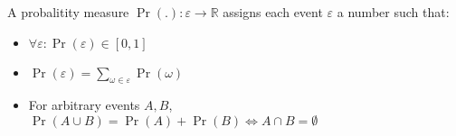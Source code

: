 A probalitity measure $\operatorname{Pr}(.): \varepsilon \to \mathbb{R}$ assigns each event $\varepsilon$ a number such that:
\begin{itemize}
	\item $\forall \varepsilon : \operatorname{Pr}(\varepsilon) \in [0, 1]$
	\item $\operatorname{Pr}(\varepsilon) = \sum\limits_{\omega \in \varepsilon} \operatorname{Pr}(\omega)$
	\item For arbitrary events $A,B$, $\operatorname{Pr}(A \cup B) = \operatorname{Pr}(A) + \operatorname{Pr}(B) \iff A \cap B = \emptyset$
\end{itemize}
